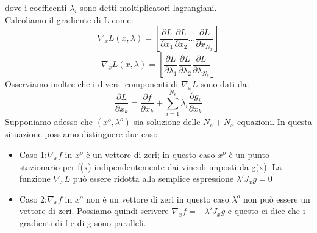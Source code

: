 dove i coefficenti $\lambda_i$ sono detti moltiplicatori lagrangiani.\\
Calcoliamo il gradiente di L come:
$$
\nabla_xL(x,\lambda)=\left[\frac{\partial L}{\partial x_1}\frac{\partial L}{\partial x_2}\dots\frac{\partial L}{\partial x_{N_x}}\right]
$$
$$
\nabla_xL(x,\lambda)=\left[\frac{\partial L}{\partial \lambda_1}\frac{\partial L}{\partial \lambda_2}\frac{\partial L}{\partial \lambda_{N_e}}\right]
$$
Osserviamo inoltre che i diversi componenti di $\nabla_xL$ sono dati da:
$$
\frac{\partial L}{\partial x_k}=\frac{\partial f}{\partial x_k}+\sum_{i=1}^{N_e}\lambda_i \frac{\partial g_i}{\partial x_k}
$$
Supponiamo adesso che $(x^o,\lambda^o)$ sia soluzione delle $N_e+N_x$ equazioni.
In questa situazione possiamo distinguere due casi:
\begin{itemize}
\item Caso 1:$\nabla_xf$ in $x^o$ è un vettore di zeri; in questo caso $x^o$ è un punto stazionario per f(x) indipendentemente dai vincoli imposti da g(x). La funzione $\nabla_xL$ può essere ridotta alla semplice espressione $\lambda 'J_xg=0$
\item Caso 2:$\nabla_xf$ in $x^o$ non è un vettore di zeri in questo caso $\lambda^o$ non può essere un vettore di zeri. Possiamo quindi scrivere
$\nabla_xf=-\lambda 'J_xg$ e questo ci dice che i gradienti di f e di g sono paralleli.
\end{itemize}

